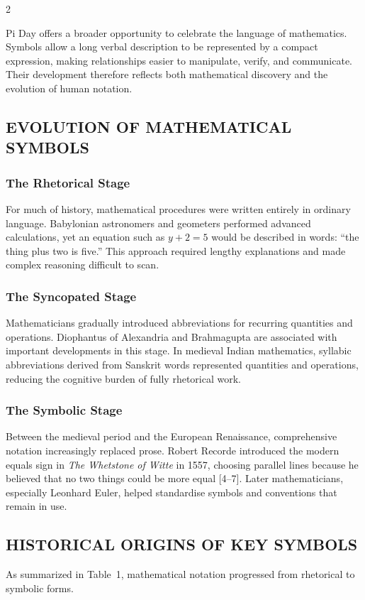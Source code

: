 \begin{multicols}{2}
  \vspace{12pt}
  \noindent
  {Pi Day offers a broader opportunity to celebrate the language of mathematics. Symbols allow a long verbal description to be represented by a compact expression, making relationships easier to manipulate, verify, and communicate. Their development therefore reflects both mathematical discovery and the evolution of human notation.\par}

  \subsection*{\centering\uppercase{Evolution of Mathematical Symbols}}
  \subsubsection*{The Rhetorical Stage}
  For much of history, mathematical procedures were written entirely in ordinary language. Babylonian astronomers and geometers performed advanced calculations, yet an equation such as $y+2=5$ would be described in words: “the thing plus two is five.” This approach required lengthy explanations and made complex reasoning difficult to scan.

  \subsubsection*{The Syncopated Stage}
  Mathematicians gradually introduced abbreviations for recurring quantities and operations. Diophantus of Alexandria and Brahmagupta are associated with important developments in this stage. In medieval Indian mathematics, syllabic abbreviations derived from Sanskrit words represented quantities and operations, reducing the cognitive burden of fully rhetorical work.

  \subsubsection*{The Symbolic Stage}
  Between the medieval period and the European Renaissance, comprehensive notation increasingly replaced prose. Robert Recorde introduced the modern equals sign in \textit{The Whetstone of Witte} in 1557, choosing parallel lines because he believed that no two things could be more equal [4--7]. Later   mathematicians, especially Leonhard Euler, helped standardise symbols and conventions that remain in use.

  \subsection*{\centering\uppercase{Historical Origins of Key Symbols}}
  As summarized in Table~1, mathematical notation progressed from rhetorical to symbolic forms.


\end{multicols}
